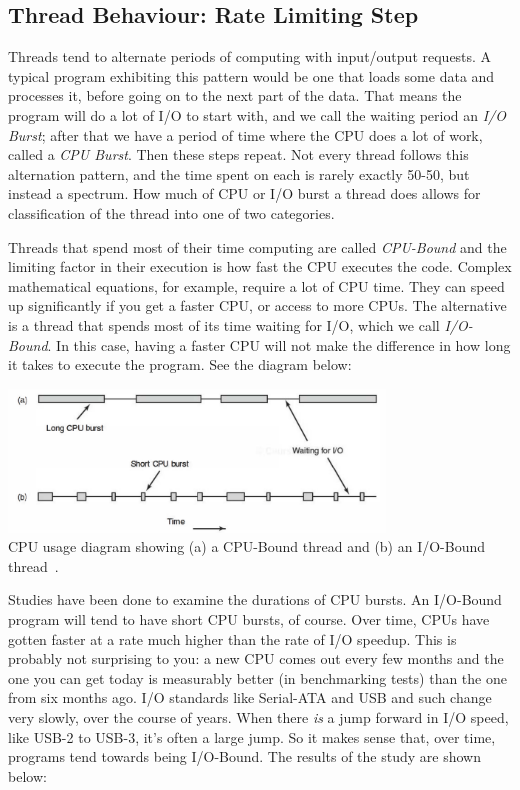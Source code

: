 \subsection*{Thread Behaviour: Rate Limiting Step}

Threads tend to alternate periods of computing with input/output requests. A typical program exhibiting this pattern would be one that loads some data and processes it, before going on to the next part of the data. That means the program will do a lot of I/O to start with, and we call the waiting period an \textit{I/O Burst}; after that we have a period of time where the CPU does a lot of work, called a \textit{CPU Burst}. Then these steps repeat. Not every thread follows this alternation pattern, and the time spent on each is rarely exactly 50-50, but instead a spectrum. How much of CPU or I/O burst a thread does allows for classification of the thread into one of two categories.

Threads that spend most of their time computing are called \textit{CPU-Bound} and the limiting factor in their execution is how fast the CPU executes the code. Complex mathematical equations, for example, require a lot of CPU time. They can speed up significantly if you get a faster CPU, or access to more CPUs. The alternative is a thread that spends most of its time waiting for I/O, which we call \textit{I/O-Bound}. In this case, having a faster CPU will not make the difference in how long it takes to execute the program. See the diagram below:

\begin{center}
\includegraphics[width=0.75\textwidth]{images/cpu-io-bound.png}\\
CPU usage diagram showing (a) a CPU-Bound thread and (b) an I/O-Bound thread~\cite{mos}.
\end{center}

Studies have been done to examine the durations of CPU bursts. An I/O-Bound program will tend to have short CPU bursts, of course. Over time, CPUs have gotten faster at a rate much higher than the rate of I/O speedup. This is probably not surprising to you: a new CPU comes out every few months and the one you can get today is measurably better (in benchmarking tests) than the one from six months ago. I/O standards like Serial-ATA and USB and such change very slowly, over the course of years. When there \textit{is} a jump forward in I/O speed, like USB-2 to USB-3, it's often a large jump. So it makes sense that, over time, programs tend towards being I/O-Bound. The results of the study are shown below:

